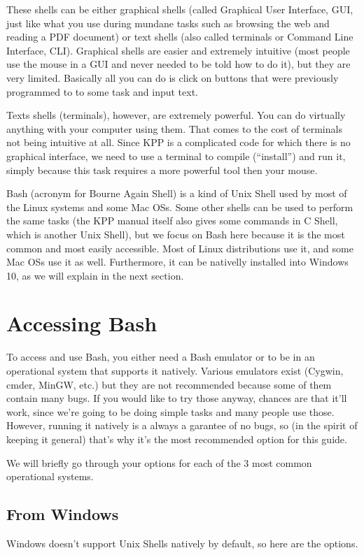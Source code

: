 \documentclass[letterpaper,10pt,openany,oneside]{sphinxmanual}
\begin{document}
These shells can be either graphical shells (called Graphical User Interface,
GUI, just like what you use during mundane tasks such as browsing the web and
reading a PDF document) or text shells (also called terminals or Command Line
Interface, CLI). Graphical shells are easier and extremely intuitive (most
people use the mouse in a GUI and never needed to be told how to do it), but
they are very limited. Basically all you can do is click on buttons that were
previously programmed to to some task and input text.

Texts shells (terminals), however, are extremely powerful. You can do virtually
anything with your computer using them. That comes to the cost of terminals not
being intuitive at all. Since KPP is a complicated code for which there is no
graphical interface, we need to use a terminal to compile (``install'') and run
it, simply because this task requires a more powerful tool then your mouse.

Bash (acronym for Bourne Again Shell) is a kind of Unix Shell used by most of
the Linux systems and some Mac OSs. Some other shells can be used to perform
the same tasks (the KPP manual itself also gives some commands in C Shell,
which is another Unix Shell), but we focus on Bash here because it is the most
common and most easily accessible.  Most of Linux distributions use it, and
some Mac OSs use it as well. Furthermore, it can be nativelly installed into
Windows 10, as we will explain in the next section.


\section{Accessing Bash}
\label{bash:accessing-bash}
To access and use Bash, you either need a Bash emulator or to be in an
operational system that supports it natively. Various emulators exist (Cygwin,
cmder, MinGW, etc.) but they are not recommended because some of them contain
many bugs. If you would like to try those anyway, chances are that it'll work,
since we're going to be doing simple tasks and many people use those. However,
running it natively is a always a garantee of no bugs, so (in the spirit of
keeping it general) that's why it's the most recommended option for this guide.

We will briefly go through your options for each of the 3 most common
operational systems.


\subsection{From Windows}
\label{bash:from-windows}
Windows doesn't support Unix Shells natively by default, so here are the
options.
\end{document}
